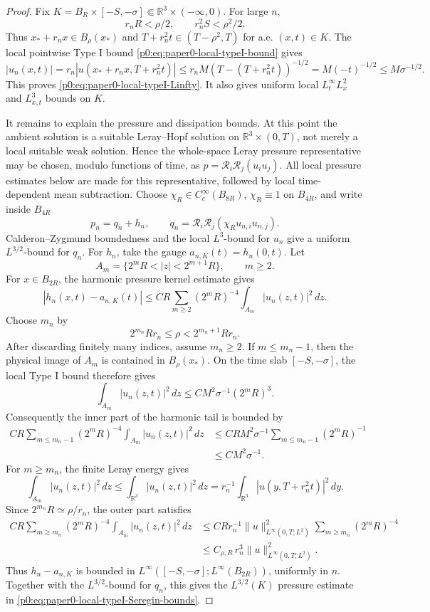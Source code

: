 \documentclass[11pt]{amsart}
\theoremstyle{plain}
\theoremstyle{definition}
\theoremstyle{remark}
\numberwithin{equation}{section}
\newcommand{\R}{\mathbb R}
\begin{document}
\begin{proof}
Fix \(K=B_R\times[-S,-\sigma]\Subset\mathbb R^3\times(-\infty,0)\).  For
large \(n\),
\[
  r_nR<\rho/2,\qquad r_n^2S<\rho^2/2.
\]
Thus \(x_*+r_nx\in B_\rho(x_*)\) and
\(T+r_n^2t\in(T-\rho^2,T)\) for a.e. \((x,t)\in K\).  The local pointwise Type I bound
\eqref{p0:eq:paper0-local-typeI-bound} gives
\[
  |u_n(x,t)|
  =r_n|u(x_*+r_nx,T+r_n^2t)|
  \le r_nM(T-(T+r_n^2t))^{-1/2}
  =M(-t)^{-1/2}
  \le M\sigma^{-1/2}.
\]
This proves \eqref{p0:eq:paper0-local-typeI-Linfty}.  It also gives
uniform local \(L^\infty_tL^2_x\) and \(L^3_{x,t}\) bounds on \(K\).

It remains to explain the pressure and dissipation bounds.  At this point the
ambient solution is a suitable Leray--Hopf solution on
\(\R^3\times(0,T)\), not merely a local suitable weak solution.  Hence the
whole-space Leray pressure representative may be chosen, modulo functions of
time, as \(p=\mathcal R_i\mathcal R_j(u_i u_j)\).  All local pressure
estimates below are made for this representative, followed by local
time-dependent mean subtraction.  Choose
\(\chi_R\in C_c^\infty(B_{8R})\), \(\chi_R\equiv1\) on \(B_{4R}\), and write
inside \(B_{4R}\)
\[
  p_n=q_n+h_n,\qquad
  q_n=\mathcal R_i\mathcal R_j(\chi_Ru_{n,i}u_{n,j}).
\]
Calderon--Zygmund boundedness and the local \(L^3\)-bound for \(u_n\) give a
uniform \(L^{3/2}\)-bound for \(q_n\).  For \(h_n\), take the gauge
\(a_{n,K}(t)=h_n(0,t)\).  Let
\[
   A_m=\{2^mR<|z|<2^{m+1}R\},\qquad m\ge2 .
\]
For \(x\in B_{2R}\), the harmonic pressure kernel estimate gives
\[
  |h_n(x,t)-a_{n,K}(t)|
  \le
  C R\sum_{m\ge2}(2^mR)^{-4}
  \int_{A_m}|u_n(z,t)|^2\,dz .
\]
Choose \(m_n\) by
\[
   2^{m_n}Rr_n\le \rho <2^{m_n+1}Rr_n .
\]
After discarding finitely many indices, assume \(m_n\ge2\).
If \(m\le m_n-1\), then the physical image of \(A_m\) is contained in
\(B_\rho(x_*)\).  On the time slab \([-S,-\sigma]\), the local Type I bound
therefore gives
\[
  \int_{A_m}|u_n(z,t)|^2\,dz
  \le C M^2\sigma^{-1}(2^mR)^3 .
\]
Consequently the inner part of the harmonic tail is bounded by
\[
\begin{aligned}
  C R\sum_{m\le m_n-1}(2^mR)^{-4}
  \int_{A_m}|u_n(z,t)|^2\,dz
  &\le C R M^2\sigma^{-1}\sum_{m\le m_n-1}(2^mR)^{-1} \\
  &\le C M^2\sigma^{-1}.
\end{aligned}
\]
For \(m\ge m_n\), the finite Leray energy gives
\[
  \int_{A_m}|u_n(z,t)|^2\,dz
  \le
  \int_{\mathbb R^3}|u_n(z,t)|^2\,dz
  =
  r_n^{-1}\int_{\mathbb R^3}|u(y,T+r_n^2t)|^2\,dy .
\]
Since \(2^{m_n}R\simeq \rho/r_n\), the outer part satisfies
\[
\begin{aligned}
  C R\sum_{m\ge m_n}(2^mR)^{-4}
  \int_{A_m}|u_n(z,t)|^2\,dz
  &\le
  C R r_n^{-1}\|u\|_{L^\infty(0,T;L^2)}^2
  \sum_{m\ge m_n}(2^mR)^{-4}  \\
  &\le
  C_{\rho,R}\,r_n^3\|u\|_{L^\infty(0,T;L^2)}^2 .
\end{aligned}
\]
Thus \(h_n-a_{n,K}\) is bounded in
\(L^\infty([-S,-\sigma];L^\infty(B_{2R}))\), uniformly in \(n\).  Together
with the \(L^{3/2}\)-bound for \(q_n\), this gives the
\(L^{3/2}(K)\) pressure estimate in
\eqref{p0:eq:paper0-local-typeI-Seregin-bounds}.


\end{proof}
\end{document}
